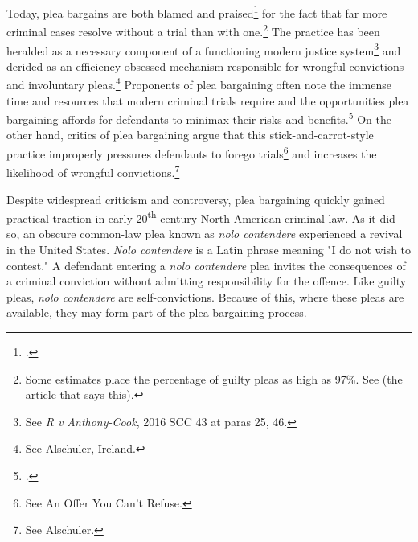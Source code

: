 Today, plea bargains are both blamed and praised\footnote{.} for the fact that far more criminal cases resolve without a trial than with one.\footnote{Some estimates place the percentage of guilty pleas as high as 97\%. See (the article that says this).} The practice has been heralded as a necessary component of a functioning modern justice system\footnote{See \textit{R v Anthony-Cook}, 2016 SCC 43 at paras 25, 46.} and derided as an efficiency-obsessed mechanism responsible for wrongful convictions and involuntary pleas.\footnote{See Alschuler, Ireland.} Proponents of plea bargaining often note the immense time and resources that modern criminal trials require and the opportunities plea bargaining affords for defendants to minimax their risks and benefits.\footnote{.} On the other hand, critics of plea bargaining argue that this stick-and-carrot-style practice improperly pressures defendants to forego trials\footnote{See An Offer You Can't Refuse.} and increases the likelihood of wrongful convictions.\footnote{See Alschuler.}

Despite widespread criticism and controversy, plea bargaining quickly gained practical traction in early 20\textsuperscript{th} century North American criminal law. As it did so, an obscure common-law plea known as \textit{nolo contendere} experienced a revival in the United States. \textit{Nolo contendere} is a Latin phrase meaning "I do not wish to contest." A defendant entering a \textit{nolo contendere} plea invites the consequences of a criminal conviction without admitting responsibility for the offence. Like guilty pleas, \textit{nolo contendere} are self-convictions. Because of this, where these pleas are available, they may form part of the plea bargaining process. 

